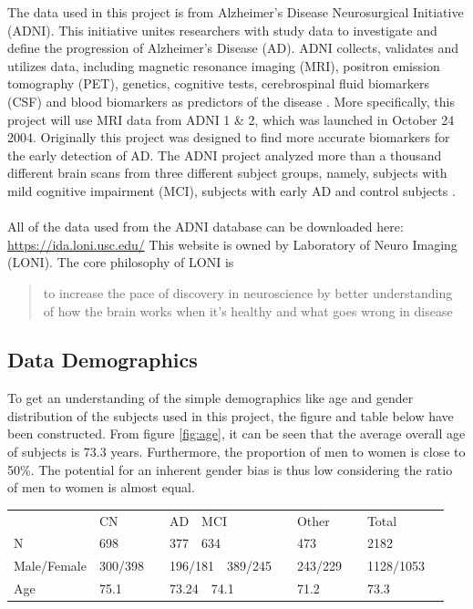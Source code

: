 \documentclass[12pt, fleqn, titlepage]{article}
\newcommand{\1}[1]{\mathds{1}\left[#1\right]}
\begin{document}
The data used in this project is from Alzheimer's Disease Neurosurgical Initiative (ADNI). This initiative unites researchers with study data to investigate and define the progression of Alzheimer's Disease (AD). 
ADNI collects, validates and utilizes data, including magnetic resonance imaging (MRI), positron emission tomography (PET), genetics, cognitive tests, cerebrospinal fluid biomarkers (CSF) and blood biomarkers as predictors of the disease \cite{adni}.
More specifically, this project will use MRI data from ADNI 1 \& 2, which was launched in October 24 2004. Originally this project was designed to find more accurate biomarkers for the early detection of AD.
The ADNI project analyzed more than a thousand different brain scans from three different subject groups, namely, subjects with mild cognitive impairment (MCI), subjects with early AD and control subjects \cite{adni1}. 
\\\\
All of the data used from the ADNI database can be downloaded here: \url{https://ida.loni.usc.edu/} \newline
This website is owned by Laboratory of Neuro Imaging (LONI). The core philosophy of LONI is \blockcquote{loni}{to increase the pace of discovery in neuroscience by better understanding of how the brain works when it’s healthy and what goes wrong in disease}.


\subsection{Data Demographics}
To get an understanding of the simple demographics like age and gender distribution of the subjects used in this project, the figure and table below have been constructed. From figure \ref{fig:age}, it can be seen that the average overall age of subjects is 73.3 years. Furthermore, the proportion of men to women is close to 50\%. The potential for an inherent gender bias is thus low considering the ratio of men to women is almost equal.

\begin{table}[H]
	\begin{tabular}{llllll}
		& CN&\ \ AD\ \ MCI &\ \ Other &\ \ Total   \\
		N & 698&\ \ 377\ \ 634 &\ \ 473 &\ \ 2182   \\
		Male/Female & 300/398&\ \ 196/181\ \ 389/245 &\ \ 243/229  &\ \ 1128/1053   \\
		Age & 75.1&\ \ 73.24\ \ 74.1 &\ \ 71.2 &\ \ 73.3   \\
	\end{tabular}
\end{table}
\end{document}
